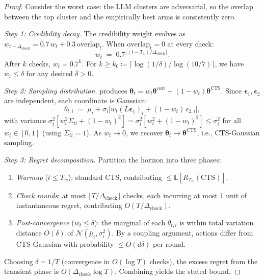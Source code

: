 \documentclass{article}
\theoremstyle{plain}
\theoremstyle{definition}
\theoremstyle{remark}
\newcommand{\E}{\mathbb{E}}
\begin{document}
\begin{proof}
Consider the worst case: the LLM clusters are adversarial, so the overlap between the top cluster and the empirically best arms is consistently zero.

\textit{Step 1: Credibility decay.}\;
The credibility weight evolves as $w_{t+\Delta_{\text{check}}} = 0.7\, w_t + 0.3\, \text{overlap}_t$.
When $\text{overlap}_t = 0$ at every check:
\[
w_t \;=\; 0.7^{\lfloor (t - T_w)/\Delta_{\text{check}} \rfloor}.
\]
After $k$ checks, $w_t = 0.7^k$.
For $k \geq k_0 \coloneqq \lceil \log(1/\delta) / \log(10/7) \rceil$, we have $w_t \leq \delta$ for any desired $\delta > 0$.

\textit{Step 2: Sampling distribution.}\;
 produces $\boldsymbol{\theta}_t = w_t \boldsymbol{\theta}^{\mathrm{corr}} + (1 - w_t) \boldsymbol{\theta}^{\mathrm{CTS}}$.
Since $\boldsymbol{\epsilon}_1, \boldsymbol{\epsilon}_2$ are independent, each coordinate is Gaussian:
\[
\theta_{t,i}
  \;=\; \bar\mu_i + \sigma_i \bigl[w_t (L\boldsymbol{\epsilon}_1)_i + (1 - w_t)\, \epsilon_{2,i}\bigr],
\]
with variance
$\sigma_i^2[w_t^2 \Sigma_{ii} + (1-w_t)^2] = \sigma_i^2[w_t^2 + (1-w_t)^2] \leq \sigma_i^2$
for all $w_t \in [0,1]$ (using $\Sigma_{ii} = 1$).
As $w_t \to 0$, we recover $\boldsymbol{\theta}_t \to \boldsymbol{\theta}^{\mathrm{CTS}}$, i.e., CTS-Gaussian sampling.

\textit{Step 3: Regret decomposition.}\;
Partition the horizon into three phases:
\begin{enumerate}
\item[(i)] \textit{Warmup} ($t \leq T_w$): standard CTS, contributing $\leq \E[R_{T_w}(\text{CTS})]$.
\item[(ii)] \textit{Check rounds}: at most $\lfloor T / \Delta_{\text{check}} \rfloor$ checks, each incurring at most 1 unit of instantaneous regret, contributing $O(T / \Delta_{\text{check}})$.
\item[(iii)] \textit{Post-convergence} ($w_t \leq \delta$): the marginal of each $\theta_{t,i}$ is within total variation distance $O(\delta)$ of $\mathcal{N}(\bar\mu_i, \sigma_i^2)$.
By a coupling argument, actions differ from CTS-Gaussian with probability $\leq O(d\delta)$ per round.
\end{enumerate}
Choosing $\delta = 1/T$ (convergence in $O(\log T)$ checks), the excess regret from the transient phase is $O(\Delta_{\text{check}} \log T)$.
Combining yields the stated bound.
\end{proof}

\medskip
\end{document}
